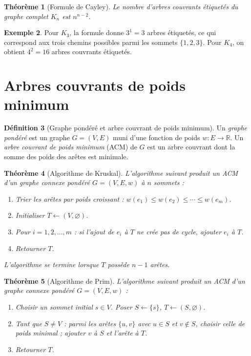 \documentclass[12pt,a4paper,openany]{book}
\theoremstyle{definition}
\newtheorem{definition}{Définition}[chapter]
\newtheorem{exemple}[definition]{Exemple}
\theoremstyle{plain}
\newtheorem{theoreme}[definition]{Théorème}
\theoremstyle{remark}
\newcommand{\R}{\mathbb{R}}
\begin{document}
\begin{theoreme}[Formule de Cayley]
\label{thm:cayley}
Le nombre d'arbres couvrants étiquetés du graphe complet $K_n$ est
$n^{n-2}$.
\end{theoreme}

\begin{exemple}
Pour $K_3$, la formule donne $3^1 = 3$ arbres étiquetés, ce qui correspond
aux trois chemins possibles parmi les sommets $\{1,2,3\}$. Pour $K_4$, on
obtient $4^2 = 16$ arbres couvrants étiquetés.
\end{exemple}

\section{Arbres couvrants de poids minimum}
\label{sec:acm}

\begin{definition}[Graphe pondéré et arbre couvrant de poids minimum]
\label{def:acm}
Un \emph{graphe pondéré} est un graphe $G=(V,E)$ muni d'une fonction de
poids $w : E \to \R$. Un \emph{arbre couvrant de poids minimum} (ACM)
de $G$ est un arbre couvrant dont la somme des poids des arêtes est
minimale.
\end{definition}

\begin{theoreme}[Algorithme de Kruskal]
\label{thm:kruskal}
L'algorithme suivant produit un ACM d'un graphe connexe pondéré
$G = (V,E,w)$ à $n$ sommets :
\begin{enumerate}
  \item Trier les arêtes par poids croissant : $w(e_1) \leq w(e_2) \leq
        \cdots \leq w(e_m)$.
  \item Initialiser $T \leftarrow (V, \varnothing)$.
  \item Pour $i = 1, 2, \dots, m$ : si l'ajout de $e_i$ à $T$ ne crée
        pas de cycle, ajouter $e_i$ à $T$.
  \item Retourner $T$.
\end{enumerate}
L'algorithme se termine lorsque $T$ possède $n-1$ arêtes.
\end{theoreme}

\begin{theoreme}[Algorithme de Prim]
\label{thm:prim}
L'algorithme suivant produit un ACM d'un graphe connexe pondéré
$G = (V,E,w)$ :
\begin{enumerate}
  \item Choisir un sommet initial $s \in V$. Poser $S \leftarrow \{s\}$,
        $T \leftarrow (S, \varnothing)$.
  \item Tant que $S \neq V$ : parmi les arêtes $\{u,v\}$ avec $u \in S$
        et $v \notin S$, choisir celle de poids minimal ; ajouter $v$ à
        $S$ et l'arête à $T$.
  \item Retourner $T$.
\end{enumerate}
\end{theoreme}
\end{document}
